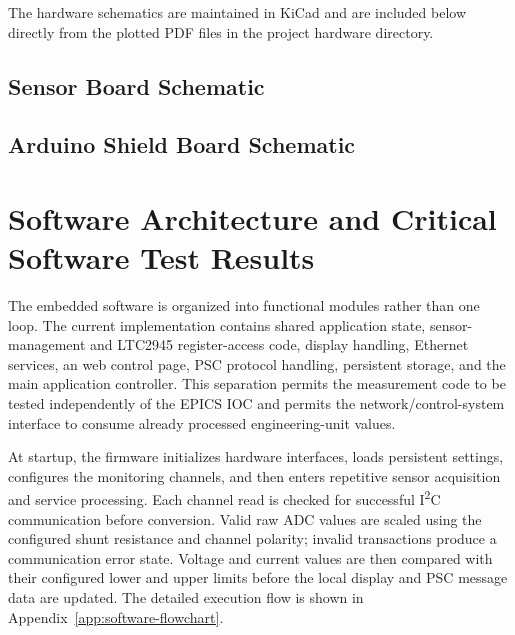 The hardware schematics are maintained in KiCad and are included
below directly from the plotted PDF files in the project hardware directory.

\subsection{Sensor Board Schematic}



\subsection{Arduino Shield Board Schematic}




\section{Software Architecture and Critical Software Test Results}
\label{sec:software-architecture-tests}
The embedded software is organized into functional modules rather than one
loop. The current implementation contains shared application state,
sensor-management and LTC2945 register-access code, display handling, Ethernet
services, an web control page, PSC protocol handling, persistent storage, and the
main application controller. This separation permits the measurement code to be
tested independently of the EPICS IOC and permits the network/control-system
interface to consume already processed engineering-unit values.

At startup, the firmware initializes hardware interfaces, loads persistent
settings, configures the monitoring channels, and then enters repetitive sensor
acquisition and service processing. Each channel read is checked for successful
I\textsuperscript{2}C communication before conversion. Valid raw ADC values are
scaled using the configured shunt resistance and channel polarity; invalid
transactions produce a communication error state. Voltage and current values
are then compared with their configured lower and upper limits before the local
display and PSC message data are updated. The detailed execution flow is shown
in Appendix~\ref{app:software-flowchart}.

